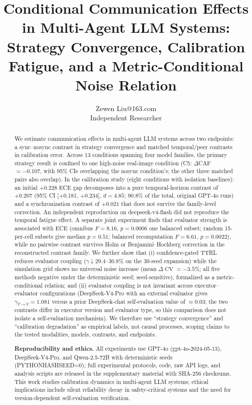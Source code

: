\documentclass[11pt]{article}
\title{Conditional Communication Effects in Multi-Agent LLM Systems: Strategy Convergence, Calibration Fatigue, and a Metric-Conditional Noise Relation}
\author{\name Zewen Liu\email 17353895263@163.com\\\addr Independent Researcher}
\date{}
\DeclareMathOperator{\CV}{CV}
\begin{document}
\maketitle

\begin{abstract}
We estimate communication effects in multi-agent LLM systems across two endpoints: a sync--nosync contrast in strategy convergence and matched temporal/peer contrasts in calibration error. Across 13 conditions spanning four model families, the primary strategy result is confined to one high-noise real-image condition (C5: $\Delta$CAF $=-0.107$, with 95\% CIs overlapping the nosync condition's; the other three matched pairs also overlap). In the calibration study (eight conditions with isolation baselines): an initial $+0.228$ ECE gap decomposes into a pure temporal-horizon contrast of $+0.207$ (95\% CI [+0.181, +0.234], $d{=}4.85$; 90.8\% of the total, original GPT-4o runs) and a synchronization contrast of $+0.021$ that does not survive the family-level correction. An independent reproduction on deepseek-v4-flash did not reproduce the temporal fatigue effect. A separate joint experiment finds that evaluator strength is associated with ECE (omnibus $F{=}8.16$, $p{=}0.0006$ one balanced subset; random 15-per-cell subsets give median $p{=}0.51$; balanced recomputation $F{=}6.61$, $p{=}0.0022$), while no pairwise contrast survives Holm or Benjamini--Hochberg correction in the reconstructed contrast family. We further show that (i) confidence-gated TTRL reduces evaluator coupling ($\gamma \downarrow 29.4$--$30.8\%$ on the 30-seed expansion) while the simulation grid shows no universal noise increase (mean $\Delta\CV = -3.5\%$; all five methods negative under the deterministic seed; seed-sensitive), formalized as a metric-conditional relation; and (ii) evaluator coupling is not invariant across executor--evaluator configurations (DeepSeek-V4-Pro with an external evaluator gives $\gamma_{T\to V}{=}1.081$ versus a prior DeepSeek-chat self-evaluation value of $\approx 0.03$; the two contrasts differ in executor version and evaluator type, so this comparison does not isolate a self-evaluation mechanism). We therefore use ``strategy convergence'' and ``calibration degradation'' as empirical labels, not causal processes, scoping claims to the tested modalities, models, contrasts, and endpoints.


	\textbf{Reproducibility and ethics.} All experiments use GPT-4o (gpt-4o-2024-05-13), DeepSeek-V4-Pro, and Qwen-2.5-72B with deterministic seeds (PYTHONHASHSEED=0); full experimental protocols, code, raw API logs, and analysis scripts are released in the supplementary material with SHA-256 checksums. This work studies calibration dynamics in multi-agent LLM systems; ethical implications include silent reliability decay in safety-critical systems and the need for version-dependent self-evaluation verification.\end{abstract}
\end{document}
